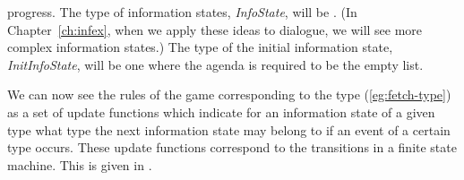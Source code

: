 progress.  The type of information states, \textit{InfoState}, will be
.  (In Chapter~\ref{ch:infex}, when we apply these ideas to dialogue, we
will see more complex information states.)  The type of the initial
information state, \textit{InitInfoState}, will be one where the agenda is required to be the
empty list.
\begin{ex}
\begin{subex} 
\item {}
\item {} 
\end{subex}
\end{ex} 
We can now see the rules of the game corresponding to the type
(\ref{eg:fetch-type}) as a set of update functions which indicate for
an information state of a given type what type the next information
state may belong to if an event of a certain type occurs.  These
update functions correspond to the transitions in a finite state
machine.  This is
given in \nexteg{}.

